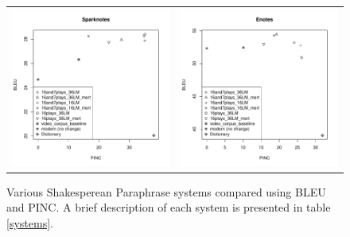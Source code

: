 \documentclass[10pt,a5paper,twoside]{article}
\begin{document}
\begin{figure}
  \begin{center}
    \begin{tabular}{cc}
      \includegraphics[width=2.4in]{figures/bleupinc1.pdf} & \includegraphics[width=2.4in]{figures/bleupinc2.pdf} \\
    \end{tabular}
  \end{center}
  \caption{Various Shakesperean Paraphrase systems compared using BLEU and PINC.  A brief description of each system is presented in table \ref{systems}.}
  \label{bleupinc}
\end{figure}
\end{document}
